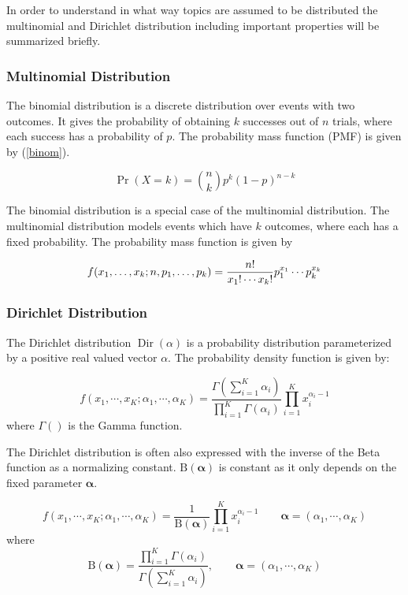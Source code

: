 \documentclass[a4paper,ngerman, english]{atseminar}
\DeclareMathOperator{\Dir}{Dir}
\begin{document}
In order to understand in what way topics are assumed to be distributed the multinomial
and Dirichlet distribution including important properties will be summarized briefly.

\subsubsection{Multinomial Distribution}

The binomial distribution is a discrete distribution over events with two outcomes. It gives
the probability of obtaining $k$ successes out of $n$ trials, where each success has a probability 
of $p$.
The probability mass function (PMF) is given by (\autoref{binom}).

\begin{equation} \label{binom}
\Pr(X = k) = \binom n k  p^k(1-p)^{n-k}
\end{equation}


The binomial distribution is a special case of the multinomial distribution.
The multinomial distribution models events which have $k$ outcomes, 
where each has a fixed probability. The probability mass function is given by 

\begin{equation}
f(x_1,\ldots,x_k;n,p_1,\ldots,p_k) = { \displaystyle {n! \over x_1!\cdots x_k!}p_1^{x_1}\cdots p_k^{x_k}}
\end{equation}


\subsubsection{Dirichlet Distribution}
The Dirichlet distribution $\Dir(\alpha)$ is a probability distribution parameterized by a positive real valued vector $\alpha$.
The probability density function is given by:

\begin{equation}
f \left(x_1,\cdots, x_{K}; \alpha_1,\cdots, \alpha_K \right) = \frac{\Gamma\left(\sum_{i=1}^K \alpha_i\right)}{\prod_{i=1}^K \Gamma(\alpha_i)} \prod_{i=1}^K x_i^{\alpha_i - 1}
\end{equation}
where $\Gamma()$ is the Gamma function.

The Dirichlet distribution is often also expressed with the inverse of the Beta function as a normalizing constant.
${\mathrm{B}(\boldsymbol\alpha)}$ is constant as it only depends on the fixed parameter $\boldsymbol\alpha$.

\begin{equation}
f \left(x_1,\cdots, x_{K}; \alpha_1,\cdots, \alpha_K \right) = \frac{1}{\mathrm{B}(\boldsymbol\alpha)} \prod_{i=1}^K x_i^{\alpha_i - 1} \qquad\boldsymbol{\alpha}=(\alpha_1,\cdots,\alpha_K) 
\end{equation}
 where 
 \begin{equation} 
 \mathrm{B}(\boldsymbol\alpha) = \frac{\prod_{i=1}^K \Gamma(\alpha_i)}{\Gamma\left(\sum_{i=1}^K \alpha_i\right)},\qquad\boldsymbol{\alpha}=(\alpha_1,\cdots,\alpha_K)
 \end{equation}
\end{document}
